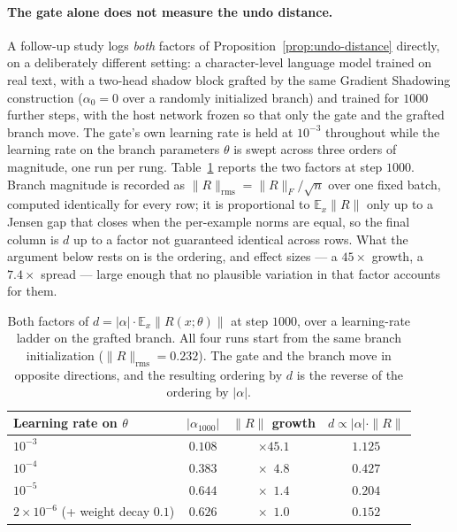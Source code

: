 \documentclass[11pt,a4paper]{article}
\begin{document}
\paragraph{The gate alone does not measure the undo distance.}
A follow-up study logs \emph{both} factors of Proposition~\ref{prop:undo-distance} directly, on a
deliberately different setting: a character-level language model trained on real text, with a
two-head shadow block grafted by the same Gradient Shadowing construction ($\alpha_0=0$ over a
randomly initialized branch) and trained for $1000$ further steps, with the host network frozen so
that only the gate and the grafted branch move. The gate's own learning rate is held at $10^{-3}$
throughout while the learning rate on the branch parameters $\theta$ is swept across three orders
of magnitude, one run per rung. Table~\ref{tab:undo-factors} reports the two
factors at step $1000$. Branch magnitude is recorded as $\|R\|_{\mathrm{rms}} = \|R\|_F/\sqrt{n}$
over one fixed batch, computed identically for every row; it is proportional to
$\mathbb{E}_x\|R\|$ only up to a Jensen gap that closes when the per-example norms are equal, so
the final column is $d$ up to a factor not guaranteed identical across rows. What the argument
below rests on is the ordering, and effect sizes --- a $45\times$ growth, a $7.4\times$ spread ---
large enough that no plausible variation in that factor accounts for them.

\begin{table}[htbp]
\centering
\caption{Both factors of $d = |\alpha|\cdot\mathbb{E}_x\|R(x;\theta)\|$ at step $1000$, over a
learning-rate ladder on the grafted branch. All four runs start from the same branch
initialization ($\|R\|_{\mathrm{rms}} = 0.232$). The gate and the branch move in opposite
directions, and the resulting ordering by $d$ is the reverse of the ordering by $|\alpha|$.}
\label{tab:undo-factors}
\begin{tabular}{l c c c}
\toprule
Learning rate on $\theta$ & $|\alpha_{1000}|$ & $\|R\|$ growth & $d \propto |\alpha|\cdot\|R\|$ \\
\midrule
$10^{-3}$              & $0.108$ & $\times 45.1$ & $1.125$ \\
$10^{-4}$              & $0.383$ & $\times\phantom{0}4.8$ & $0.427$ \\
$10^{-5}$              & $0.644$ & $\times\phantom{0}1.4$ & $0.204$ \\
$2\times10^{-6}$ (+ weight decay $0.1$) & $0.626$ & $\times\phantom{0}1.0$ & $0.152$ \\
\bottomrule
\end{tabular}
\end{table}
\end{document}

